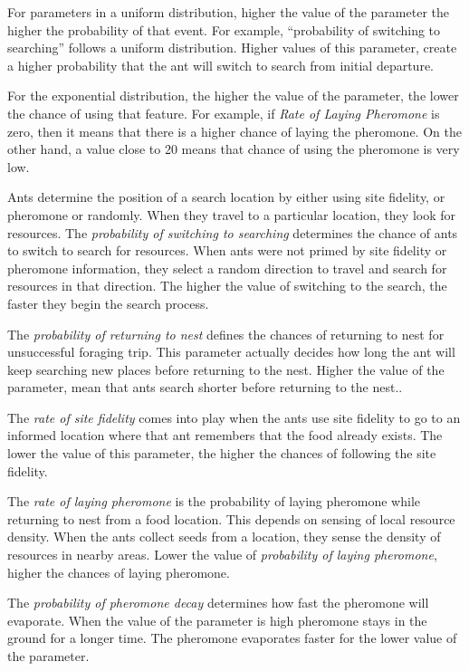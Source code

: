 For parameters in a uniform distribution, higher the value of the parameter the higher the probability of that event. For example, ``probability of switching to searching'' follows a uniform distribution. Higher values of this parameter, create a higher probability that the ant will switch to search from initial departure. \par
For the exponential distribution, the higher the value of the parameter, the lower the chance of using that feature. For example, if \textit{Rate of Laying Pheromone} is zero, then it means that there is a higher chance of laying the pheromone. On the other hand,  a value close to 20 means that chance of using the pheromone is very low.\par 
Ants determine the position of a search location by either using site fidelity, or pheromone or randomly. When they travel to a particular location, they look for resources. The \textit{probability of switching to searching} determines the chance of ants to switch to search for resources. When ants were not primed by site fidelity or pheromone information, they select a random direction to travel and search for resources in that direction. The higher the value of switching to the search, the faster they begin the search process.\par 
The \textit{probability of returning to nest} defines the chances of returning to nest for unsuccessful foraging trip. This parameter actually decides how long the ant will keep searching new places before returning to the nest. Higher the value of the parameter, mean that ants search shorter before returning to the nest..\par 
The \textit{rate of site fidelity} comes into play when the ants use site fidelity to go to an informed location where that ant remembers that the food already exists. The lower the value of this parameter, the higher the chances of following the site fidelity. \par 
The \textit{rate of laying pheromone} is the probability of laying pheromone while returning to nest from a food location. This depends on sensing of local resource density. When the ants collect seeds from a location, they sense the density of resources in nearby areas. Lower the value of \textit{probability of laying pheromone}, higher the chances of laying pheromone. \par 
The \textit{probability of pheromone decay} determines how fast the pheromone will evaporate. When the value of the parameter is high pheromone stays in the ground for a longer time. The pheromone evaporates faster for the lower value of the parameter.
